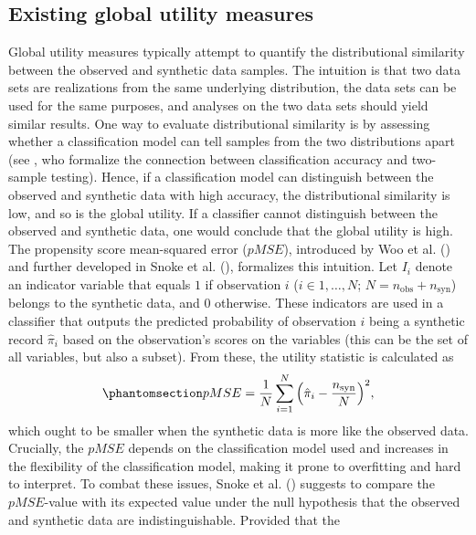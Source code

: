 \documentclass[
]{article}
\newcommand{\nobs}{n_{\text{obs}}}
\newcommand{\nsyn}{n_{\text{syn}}}
\begin{document}
\subsection{Existing global utility
measures}\label{existing-global-utility-measures}

Global utility measures typically attempt to quantify the distributional
similarity between the observed and synthetic data samples. The
intuition is that two data sets are realizations from the same
underlying distribution, the data sets can be used for the same
purposes, and analyses on the two data sets should yield similar
results. One way to evaluate distributional similarity is by assessing
whether a classification model can tell samples from the two
distributions apart (see , who formalize the connection between classification accuracy
and two-sample testing). Hence, if a classification model can
distinguish between the observed and synthetic data with high accuracy,
the distributional similarity is low, and so is the global utility. If a
classifier cannot distinguish between the observed and synthetic data,
one would conclude that the global utility is high. The propensity score
mean-squared error (\(pMSE\)), introduced by Woo et al.
() and further developed in Snoke et
al. (), formalizes this
intuition. Let \(I_i\) denote an indicator variable that equals \(1\) if
observation \(i\) (\(i \in 1, \dots, N\); \(N = \nobs + \nsyn\)) belongs
to the synthetic data, and \(0\) otherwise. These indicators are used in
a classifier that outputs the predicted probability of observation \(i\)
being a synthetic record \(\hat{\pi}_i\) based on the observation's
scores on the variables (this can be the set of all variables, but also
a subset). From these, the utility statistic is calculated as
\begin{equation}\phantomsection\label{eq-pMSE}{
pMSE = \frac{1}{N} \sum_{i=1}^N \Big(\hat{\pi}_i - \frac{\nsyn}{N}\Big)^2,
}\end{equation} which ought to be smaller when the synthetic data is
more like the observed data. Crucially, the \(pMSE\) depends on the
classification model used and increases in the flexibility of the
classification model, making it prone to overfitting and hard to
interpret. To combat these issues, Snoke et al.
() suggests to compare the
\(pMSE\)-value with its expected value under the null hypothesis that
the observed and synthetic data are indistinguishable. Provided that the
\end{document}
